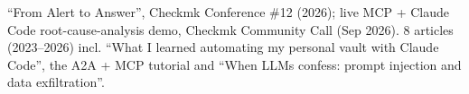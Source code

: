 
\begin{cventries}
\begin{linelist}
    {``From Alert to Answer'', Checkmk Conference \#12 (2026); live MCP + Claude Code root-cause-analysis demo, Checkmk Community Call (Sep 2026). 8 articles (2023--2026) incl. ``What I learned automating my personal vault with Claude Code'', the A2A + MCP tutorial and ``When LLMs confess: prompt injection and data exfiltration''.}
\end{linelist}
\end{cventries}
